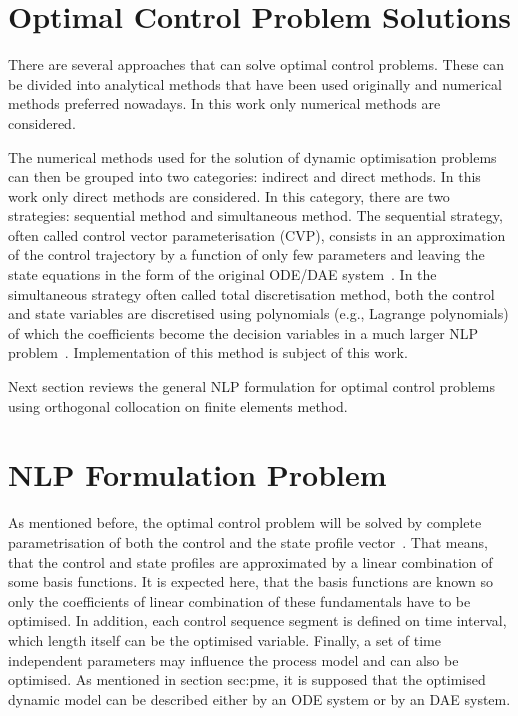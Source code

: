 \section{Optimal Control Problem Solutions}
\label{sec:ocps}

There are several approaches that can solve optimal control problems.
These can be divided into analytical methods that have been used
originally and numerical methods preferred nowadays. In this work only
numerical methods are considered.

The numerical methods used for the solution of dynamic optimisation
problems can then be grouped into two categories: indirect and direct
methods. In this work only direct methods are considered. In this
category, there are two strategies: sequential method and simultaneous
method. The sequential strategy, often called control vector
parameterisation (CVP), consists in an approximation of the control
trajectory by a function of only few parameters and leaving the state
equations in the form of the original ODE/DAE system~\cite{goh88}. In
the simultaneous strategy often called total discretisation method,
both the control and state variables are discretised using polynomials
(e.g., Lagrange polynomials) of which the coefficients become the
decision variables in a much larger NLP problem~\cite{cut87}.
Implementation of this method is subject of this work.

Next section reviews the general NLP formulation for optimal control
problems using orthogonal collocation on finite elements method.

\section{NLP Formulation Problem}
\label{sec:nlp-fp}

As mentioned before, the optimal control problem will be solved by
complete parametrisation of both the control and the state profile
vector~\citep{log89,log92}. That means, that the control and state
profiles are approximated by a linear combination of some basis
functions. It is expected here, that the basis functions are known so
only the coefficients of linear combination of these fundamentals have
to be optimised. In addition, each control sequence segment is defined
on time interval, which length itself can be the optimised
variable. Finally, a set of time independent parameters may influence
the process model and can also be optimised. As mentioned
in section {sec:pme}, it is supposed that the optimised dynamic model can
be described either by an ODE system or by an DAE system.

